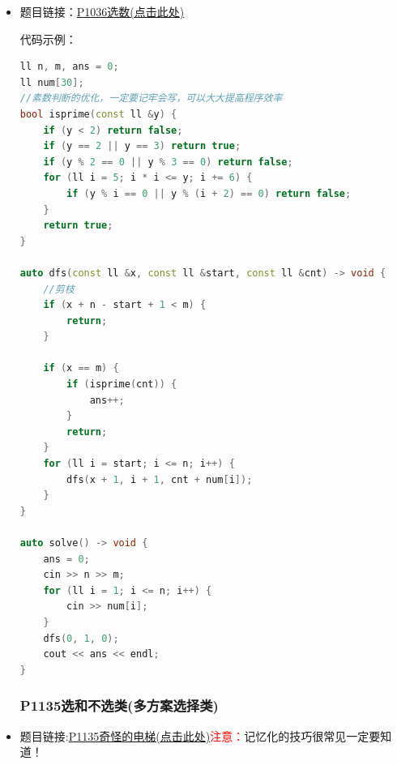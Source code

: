 \begin{itemize}
代码示例：\\
\begin{lstlisting}[language=C++]
ll n, res[5], cnt = 0;
ll to[10] = {6, 2, 5, 5, 4, 5, 6, 3, 7, 6};

auto total(ll x) -> ll {
	ll ans = 0;
	if (x == 0) return 6;
	while (x) {
		ans += to[x % 10];
		x /= 10;
	}
	return ans;
}

auto dfs(const ll &x) -> void {
	if (x > 2) {
		ll c = res[1] + res[2];
		if (total(res[1]) + total(res[2]) + total(c) == n - 4) {
			cnt++;
		}
		return;
	}
	
	for (ll i = 0; i <= N; i++) {
		res[x] = i;
		dfs(x + 1);
	}
}

auto solve() -> void {
	cin >> n;
	cnt = 0;
	dfs(1);
	cout << cnt << endl;
}
\end{lstlisting}
\subsubsection{P1036选数}
\item 题目链接：\href{https://www.luogu.com.cn/problem/P1036}{P1036选数(点击此处)}

代码示例：\\
\begin{lstlisting}[language=C++]
ll n, m, ans = 0;
ll num[30];
//素数判断的优化，一定要记牢会写，可以大大提高程序效率
bool isprime(const ll &y) {
	if (y < 2) return false;
	if (y == 2 || y == 3) return true;
	if (y % 2 == 0 || y % 3 == 0) return false;
	for (ll i = 5; i * i <= y; i += 6) {
		if (y % i == 0 || y % (i + 2) == 0) return false;
	}
	return true;
}

auto dfs(const ll &x, const ll &start, const ll &cnt) -> void {
	//剪枝
	if (x + n - start + 1 < m) {
		return;
	}
	
	if (x == m) {
		if (isprime(cnt)) {
			ans++;
		}
		return;
	}
	for (ll i = start; i <= n; i++) {
		dfs(x + 1, i + 1, cnt + num[i]);
	}
}

auto solve() -> void {
	ans = 0;
	cin >> n >> m;
	for (ll i = 1; i <= n; i++) {
		cin >> num[i];
	}
	dfs(0, 1, 0);
	cout << ans << endl;
}
\end{lstlisting}
\subsubsection{P1135选和不选类(多方案选择类)}
\item 题目链接:\href{https://www.luogu.com.cn/problem/P1135}{P1135奇怪的电梯(点击此处)}\textcolor{red}{注意：}记忆化的技巧很常见一定要知道！


\end{itemize}
